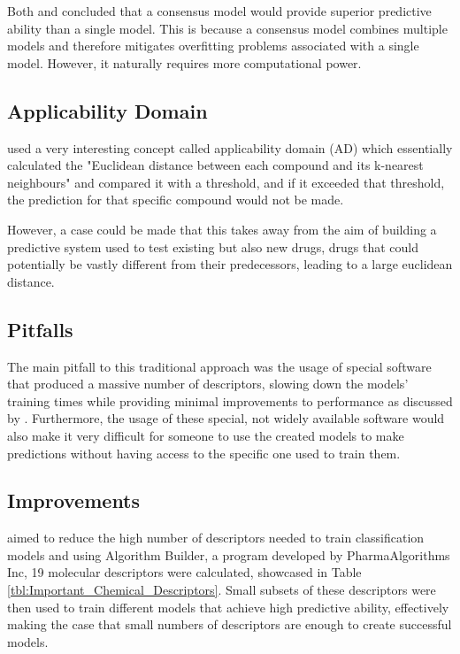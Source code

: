 Both \citet{Singh2020} and \citet{Zhang2008} concluded that a 
consensus model would provide superior predictive ability than a single model. This is because a consensus model combines multiple models and therefore mitigates overfitting problems associated with a single model. However, it naturally requires more computational power.

\subsection{Applicability Domain}

\citet{Zhang2008} used a very interesting concept called applicability domain (AD) which essentially calculated the "Euclidean distance between each compound and its k-nearest neighbours" and compared it with a threshold, and if it exceeded that threshold, the prediction for that specific compound would not be made.
 
 However, a case could be made that this takes away from the aim of building a predictive system used to test existing but also new drugs, drugs that could potentially be vastly different from their predecessors, leading to a large euclidean distance.

\subsection{Pitfalls}

The main pitfall to this traditional approach was the usage of special software that produced a massive number of descriptors, slowing down the models' training times while providing minimal improvements to performance as discussed by \citet{Zhao2007}. Furthermore, the usage of these special, not widely available software would also make it very difficult for someone to use the created models to make predictions without having access to the specific one used to train them.

\subsection{Improvements}

\citet{Zhao2007} aimed to reduce the high number of descriptors needed to train classification models and using Algorithm Builder, a program developed by PharmaAlgorithms Inc, 19 molecular descriptors were calculated, showcased in Table \ref{tbl:Important_Chemical_Descriptors}. Small subsets of these descriptors were then used to train different models that achieve high predictive ability, effectively making the case that small numbers of descriptors are enough to create successful models.

